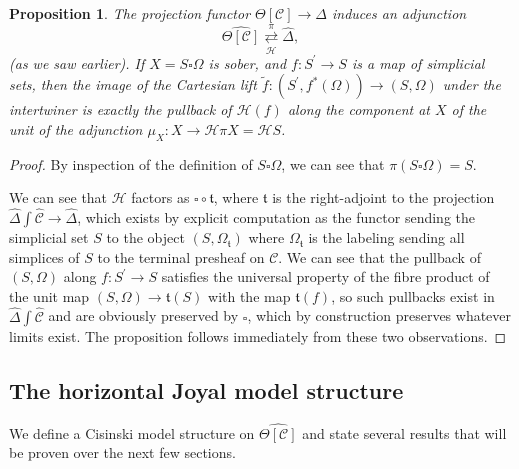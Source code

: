 \documentclass[a4paper]{article}
\numberwithin{equation}{subsection}
\theoremstyle{plain}   %
\newtheorem{prop}[equation]{Proposition}
\theoremstyle{definition}
\theoremstyle{remark}
\theoremstyle{plain}
\newcommand{\psh}[1]{\ensuremath{\widehat{#1}}}
\providecommand{\C}{}
\renewcommand{\C}{\ensuremath{\mathcal{C}}}
\newcommand{\cellset}{\ensuremath{\widehat{\Theta[\mathcal{C}]}}}
\newcommand{\ssetlab}{\ensuremath{\widehat{\Delta} \int \widehat{\mathcal{C}}}}
\begin{document}
\begin{prop}\label{pullbacksober}
	The projection functor \(\Theta[\C]\to \Delta\) induces an adjunction 
	\[
		\cellset \underset{\mathscr{H}}{\overset{\pi}{\rightleftarrows}} \psh{\Delta},
	\]
	(as we saw earlier). If \(X=S\square\Omega\) is sober, and \(f:S^\prime\to S\) is a map of simplicial sets, then the image of the Cartesian lift \(\tilde{f}:(S^\prime, f^\ast(\Omega))\to (S,\Omega)\) under the intertwiner is exactly the pullback of \(\mathscr{H}(f)\) along the component at \(X\) of the unit of the adjunction \(\mu_X:X\to \mathscr{H}\pi X= \mathscr{H} S\).
\end{prop}
\begin{proof} 
	By inspection of the definition of \(S\square\Omega\), we can see that \(\pi(S\square\Omega)=S\).

	We can see that \(\mathscr{H}\) factors as \(\square\circ \mathfrak{t}\), where \(\mathfrak{t}\) is the right-adjoint to the projection \(\ssetlab\to \psh{\Delta}\), which exists by explicit computation as the functor sending the simplicial set \(S\) to the object \((S,\Omega_{\mathfrak{t}})\) where \(\Omega_{\mathfrak{t}}\) is the labeling sending all simplices of \(S\) to the terminal presheaf on \(\C\).   We can see that the pullback of \((S,\Omega)\) along \(f:S^\prime\to S\) satisfies the universal property of the fibre product of the unit map \((S,\Omega)\to \mathfrak{t}(S)\) with the map \(\mathfrak{t}(f)\), so such pullbacks exist in \(\ssetlab\) and are obviously preserved by \(\square\), which by construction preserves whatever limits exist. The proposition follows immediately from these two observations.
\end{proof}


\subsection{The horizontal Joyal model structure}
We define a Cisinski model structure on \(\cellset\) and state several results that will be proven over the next few sections.
\end{document}
